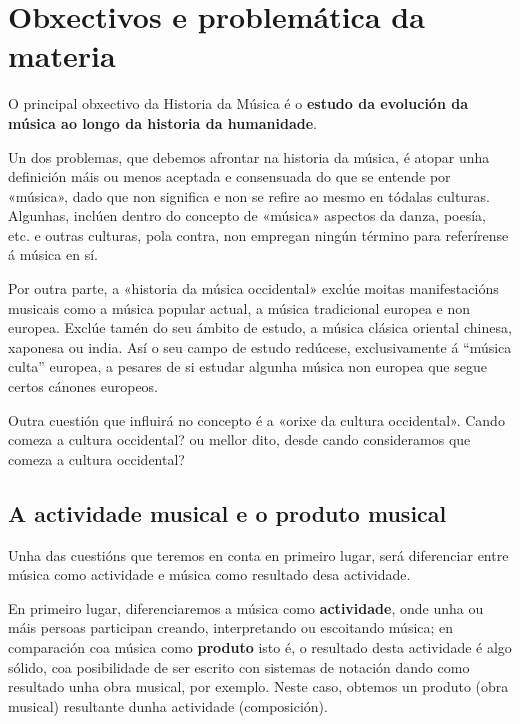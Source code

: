 \documentclass[a4paper, twoside]{templates/ociamthesis}
\theoremstyle{definition}
\theoremstyle{definition}
\theoremstyle{definition}
\theoremstyle{definition}
\theoremstyle{remark}
\begin{document}
\hypertarget{obxectivos-e-problemuxe1tica-da-materia}{%
\section*{Obxectivos e problemática da materia}\label{obxectivos-e-problemuxe1tica-da-materia}}

O principal obxectivo da Historia da Música é o \textbf{estudo da evolución da música ao longo da historia da humanidade}.

Un dos problemas, que debemos afrontar na historia da música, é atopar unha definición máis ou menos aceptada e consensuada do que se entende por «música», dado que non significa e non se refire ao mesmo en tódalas culturas. Algunhas, inclúen dentro do concepto de «música» aspectos da danza, poesía, etc. e outras culturas, pola contra, non empregan ningún término para referírense á música en sí.

Por outra parte, a «historia da música occidental» exclúe moitas manifestacións musicais como a música popular actual, a música tradicional europea e non europea. Exclúe tamén do seu ámbito de estudo, a música clásica oriental chinesa, xaponesa ou india. Así o seu campo de estudo redúcese, exclusivamente á ``música culta'' europea, a pesares de si estudar algunha música non europea que segue certos cánones europeos.

Outra cuestión que influirá no concepto é a «orixe da cultura occidental». Cando comeza a cultura occidental? ou mellor dito, desde cando consideramos que comeza a cultura occidental?

\hypertarget{a-actividade-musical-e-o-produto-musical}{%
\subsection*{A actividade musical e o produto musical}\label{a-actividade-musical-e-o-produto-musical}}

Unha das cuestións que teremos en conta en primeiro lugar, será diferenciar entre música como actividade e música como resultado desa actividade.

En primeiro lugar, diferenciaremos a música como \textbf{actividade}, onde unha ou máis persoas participan creando, interpretando ou escoitando música; en comparación coa música como \textbf{produto} isto é, o resultado desta actividade é algo sólido, coa posibilidade de ser escrito con sistemas de notación dando como resultado unha obra musical, por exemplo. Neste caso, obtemos un produto (obra musical) resultante dunha actividade (composición).
\end{document}
